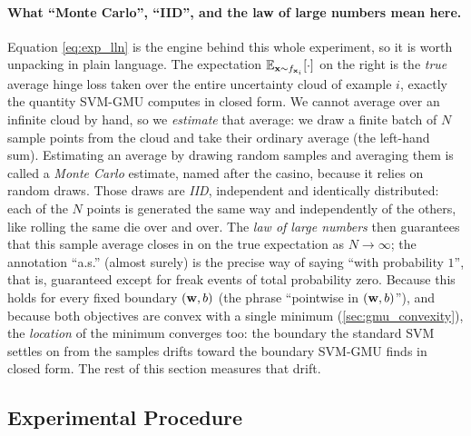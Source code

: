 \documentclass[11pt, letterpaper]{article}
\newcommand{\E}{\mathbb{E}}
\begin{document}
\paragraph{What ``Monte Carlo'', ``IID'', and the law of large numbers mean here.} Equation \cref{eq:exp_lln} is the engine behind this whole experiment, so it is worth unpacking in plain language. The expectation $\E_{\vb{x}\sim f_{\vb{x}_i}}[\cdot]$ on the right is the \emph{true} average hinge loss taken over the entire uncertainty cloud of example $i$, exactly the quantity SVM-GMU computes in closed form. We cannot average over an infinite cloud by hand, so we \emph{estimate} that average: we draw a finite batch of $N$ sample points from the cloud and take their ordinary average (the left-hand sum). Estimating an average by drawing random samples and averaging them is called a \emph{Monte Carlo} estimate, named after the casino, because it relies on random draws. Those draws are \emph{IID}, independent and identically distributed: each of the $N$ points is generated the same way and independently of the others, like rolling the same die over and over. The \emph{law of large numbers} then guarantees that this sample average closes in on the true expectation as $N \to \infty$; the annotation ``a.s.'' (almost surely) is the precise way of saying ``with probability $1$'', that is, guaranteed except for freak events of total probability zero. Because this holds for every fixed boundary $(\vb{w}, b)$ (the phrase ``pointwise in $(\vb{w}, b)$''), and because both objectives are convex with a single minimum (\cref{sec:gmu_convexity}), the \emph{location} of the minimum converges too: the boundary the standard SVM settles on from the samples drifts toward the boundary SVM-GMU finds in closed form. The rest of this section measures that drift.

\subsection{Experimental Procedure}
\end{document}
